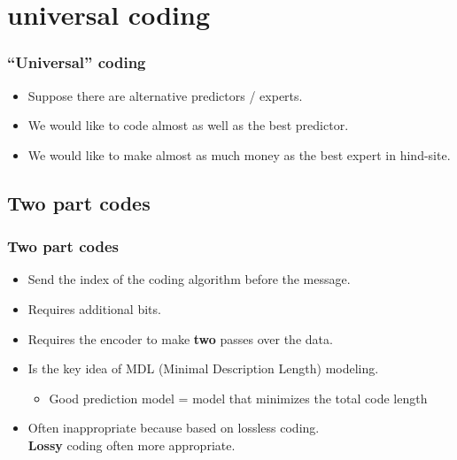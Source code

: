 \documentclass[handout]{beamer}
\begin{document}


\section{universal coding}

\begin{frame}
\frametitle{``Universal'' coding}
\begin{itemize}
\item Suppose there are  alternative predictors / experts.
\item We would like to code almost as well as the best predictor.
\item We would like to make almost as much money as the best expert in hind-site.
\end{itemize}
\end{frame}

\subsection{Two part codes}

\begin{frame}
\frametitle{Two part codes}
\begin{itemize}
\item Send the index of the coding algorithm before the message.
\item Requires  additional bits.
\item Requires the encoder to make {\bf two} passes over the data.
\item Is the key idea of {\color{blue}MDL} (Minimal Description Length) modeling.
\begin{itemize}
\item Good prediction model = model that minimizes the total code length
\end{itemize}
\item Often inappropriate because based on {\color{blue} lossless} coding. \\
{\bf Lossy} coding often more appropriate.
\end{itemize}
\end{frame}
\end{document}
